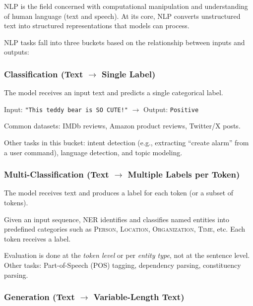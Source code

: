 \documentclass[11pt, a4paper]{article}
\begin{document}
\begin{defbox}
NLP is the field concerned with computational manipulation and understanding of human language (text and speech). At its core, NLP converts unstructured text into structured representations that models can process.
\end{defbox}

NLP tasks fall into three buckets based on the relationship between inputs and outputs:

\subsubsection{Classification (Text $\to$ Single Label)}

The model receives an input text and predicts a single categorical label.

\begin{exbox}
Input: \texttt{"This teddy bear is SO CUTE!"} $\to$ Output: \texttt{Positive}

Common datasets: IMDb reviews, Amazon product reviews, Twitter/X posts.
\end{exbox}

Other tasks in this bucket: intent detection (e.g., extracting ``create alarm'' from a user command), language detection, and topic modeling.

\subsubsection{Multi-Classification (Text $\to$ Multiple Labels per Token)}

The model receives text and produces a label for each token (or a subset of tokens).

\begin{defbox}
Given an input sequence, NER identifies and classifies named entities into predefined categories such as \textsc{Person}, \textsc{Location}, \textsc{Organization}, \textsc{Time}, etc. Each token receives a label.
\end{defbox}

Evaluation is done at the \emph{token level} or per \emph{entity type}, not at the sentence level. Other tasks: Part-of-Speech (POS) tagging, dependency parsing, constituency parsing.

\subsubsection{Generation (Text $\to$ Variable-Length Text)}
\end{document}

